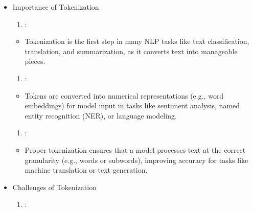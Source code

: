 \documentclass[letterpaper,11pt,english]{sphinxmanual}
\begin{document}
\begin{itemize}
\begin{itemize}
\begin{description}
\end{description}

\end{itemize}

\item {} 
\sphinxAtStartPar
Importance of Tokenization
\begin{enumerate}
%
\item {} 
\sphinxAtStartPar
{}:

\end{enumerate}
\begin{itemize}
\item {} 
\sphinxAtStartPar
Tokenization is the first step in many NLP tasks like text classification, translation, and
summarization, as it converts text into manageable pieces.

\end{itemize}
\begin{enumerate}
%
\setcounter{enumi}{1}
\item {} 
\sphinxAtStartPar
{}:

\end{enumerate}
\begin{itemize}
\item {} 
\sphinxAtStartPar
Tokens are converted into numerical representations (e.g., word embeddings) for model input
in tasks like sentiment analysis, named entity recognition (NER), or language modeling.

\end{itemize}
\begin{enumerate}
%
\setcounter{enumi}{2}
\item {} 
\sphinxAtStartPar
{}:

\end{enumerate}
\begin{itemize}
\item {} 
\sphinxAtStartPar
Proper tokenization ensures that a model processes text at the correct granularity (e.g.,
words or subwords), improving accuracy for tasks like machine translation or text generation.

\end{itemize}

\item {} 
\sphinxAtStartPar
Challenges of Tokenization
\begin{enumerate}
%
\item {} 
\sphinxAtStartPar
{}:


\end{enumerate}
\end{itemize}
\end{document}

